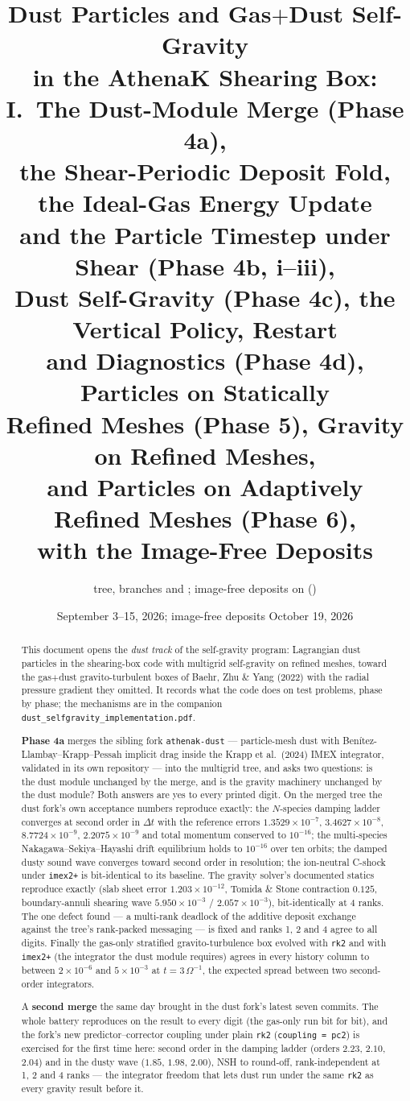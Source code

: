 \documentclass[11pt]{article}
\title{Dust Particles and Gas$+$Dust Self-Gravity\\
       in the AthenaK Shearing Box:\\
       I.\ The Dust-Module Merge (Phase 4a),\\
       the Shear-Periodic Deposit Fold, the Ideal-Gas Energy Update\\
       and the Particle Timestep under Shear (Phase 4b, i--iii),\\
       Dust Self-Gravity (Phase 4c), the Vertical Policy, Restart\\
       and Diagnostics (Phase 4d), Particles on Statically\\
       Refined Meshes (Phase 5), Gravity on Refined Meshes,\\
       and Particles on Adaptively Refined Meshes (Phase 6),\\
       with the Image-Free Deposits}
\author{\code{athenak-multigrid} tree, branches \code{dust-multigrid} and \code{dust-smr};
        image-free deposits on \code{si-strat-amr} (\code{1f811c1c})}
\date{September 3--15, 2026; image-free deposits October 19, 2026}
\newcommand{\code}[1]{\texttt{#1}}
\newcommand{\file}[1]{\texttt{#1}}
\newcommand{\Om}{\Omega}
\begin{document}
\maketitle

\begin{abstract}
\noindent
This document opens the \emph{dust track} of the self-gravity program: Lagrangian
dust particles in the shearing-box code with multigrid self-gravity on refined
meshes, toward the gas$+$dust gravito-turbulent boxes of Baehr, Zhu \& Yang (2022)
with the radial pressure gradient they omitted. It records what the code does on
test problems, phase by phase; the mechanisms are in the companion
\file{dust\_selfgravity\_implementation.pdf}.

\textbf{Phase 4a} merges the sibling fork \code{athenak-dust} --- particle-mesh dust
with Benítez-Llambay--Krapp--Pessah implicit drag inside the Krapp et al.\ (2024)
IMEX integrator, validated in its own repository --- into the multigrid tree, and
asks two questions: is the dust module unchanged by the merge, and is the gravity
machinery unchanged by the dust module? Both answers are yes to every printed digit.
On the merged tree the dust fork's own acceptance numbers reproduce exactly: the
$N$-species damping ladder converges at second order in $\Delta t$ with the
reference errors $1.3529\times10^{-7}$, $3.4627\times10^{-8}$, $8.7724\times10^{-9}$,
$2.2075\times10^{-9}$ and total momentum conserved to $10^{-16}$; the multi-species
Nakagawa--Sekiya--Hayashi drift equilibrium holds to $10^{-16}$ over ten orbits; the
damped dusty sound wave converges toward second order in resolution; the ion-neutral
C-shock under \code{imex2+} is bit-identical to its baseline. The gravity solver's
documented statics reproduce exactly (slab sheet error $1.203\times10^{-12}$, Tomida
\& Stone contraction $0.125$, boundary-annuli shearing wave
$5.950\times10^{-3}$ / $2.057\times10^{-3}$), bit-identically at 4 ranks. The one
defect found --- a multi-rank deadlock of the additive deposit exchange against the
tree's rank-packed messaging --- is fixed and ranks 1, 2 and 4 agree to all digits.
Finally the gas-only stratified gravito-turbulence box evolved with \code{rk2} and
with \code{imex2+} (the integrator the dust module requires) agrees in every history
column to between $2\times10^{-6}$ and $5\times10^{-3}$ at $t = 3\,\Om^{-1}$, the
expected spread between two second-order integrators.

A \textbf{second merge} the same day brought in the dust fork's latest seven commits.
The whole battery reproduces on the result to every digit (the gas-only run bit for
bit), and the fork's new predictor--corrector coupling under plain \code{rk2}
(\code{coupling = pc2}) is exercised for the first time here: second order in the
damping ladder (orders $2.23$, $2.10$, $2.04$) and in the dusty wave ($1.85$, $1.98$,
$2.00$), NSH to round-off, rank-independent at 1, 2 and 4 ranks --- the integrator
freedom that lets dust run under the same \code{rk2} as every gravity result before it.


\end{abstract}
\end{document}
